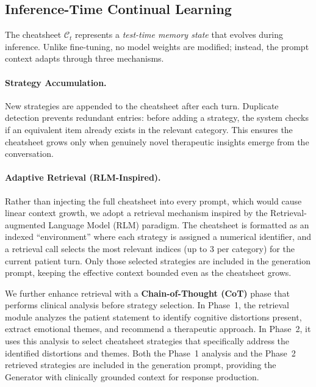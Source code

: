 \subsection{Inference-Time Continual Learning}

The cheatsheet $\mathcal{C}_t$ represents a \emph{test-time memory state} that evolves during inference. Unlike fine-tuning, no model weights are modified; instead, the prompt context adapts through three mechanisms.

\paragraph{Strategy Accumulation.}
New strategies are appended to the cheatsheet after each turn. Duplicate detection prevents redundant entries: before adding a strategy, the system checks if an equivalent item already exists in the relevant category. This ensures the cheatsheet grows only when genuinely novel therapeutic insights emerge from the conversation.

\paragraph{Adaptive Retrieval (RLM-Inspired).}
Rather than injecting the full cheatsheet into every prompt, which would cause linear context growth, we adopt a retrieval mechanism inspired by the Retrieval-augmented Language Model (RLM) paradigm. The cheatsheet is formatted as an indexed ``environment'' where each strategy is assigned a numerical identifier, and a retrieval call selects the most relevant indices (up to 3 per category) for the current patient turn. Only those selected strategies are included in the generation prompt, keeping the effective context bounded even as the cheatsheet grows.

We further enhance retrieval with a \textbf{Chain-of-Thought (CoT)} phase that performs clinical analysis before strategy selection. In Phase~1, the retrieval module analyzes the patient statement to identify cognitive distortions present, extract emotional themes, and recommend a therapeutic approach. In Phase~2, it uses this analysis to select cheatsheet strategies that specifically address the identified distortions and themes. Both the Phase~1 analysis and the Phase~2 retrieved strategies are included in the generation prompt, providing the Generator with clinically grounded context for response production.

